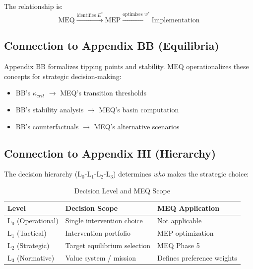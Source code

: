 The relationship is:
\begin{equation}
\text{MEQ} \xrightarrow{\text{identifies } E^*} \text{MEP} \xrightarrow{\text{optimizes } w^*} \text{Implementation}
\end{equation}

\subsection{Connection to Appendix BB (Equilibria)}

Appendix BB formalizes tipping points and stability. MEQ operationalizes these
concepts for strategic decision-making:

\begin{itemize}[nosep]
    \item BB's $\kappa_{crit}$ $\to$ MEQ's transition thresholds
    \item BB's stability analysis $\to$ MEQ's basin computation
    \item BB's counterfactuals $\to$ MEQ's alternative scenarios
\end{itemize}

\subsection{Connection to Appendix HI (Hierarchy)}

The decision hierarchy (L$_0$-L$_1$-L$_2$-L$_3$) determines \textit{who} makes
the strategic choice:

\begin{table}[H]
\centering
\caption{Decision Level and MEQ Scope}
\label{tab:meq-hierarchy}
\renewcommand{\arraystretch}{1.3}
\begin{tabular}{@{}lll@{}}
\toprule
\textbf{Level} & \textbf{Decision Scope} & \textbf{MEQ Application} \\
\midrule
L$_0$ (Operational) & Single intervention choice & Not applicable \\
L$_1$ (Tactical) & Intervention portfolio & MEP optimization \\
L$_2$ (Strategic) & Target equilibrium selection & MEQ Phase 5 \\
L$_3$ (Normative) & Value system / mission & Defines preference weights \\
\bottomrule
\end{tabular}
\end{table}

